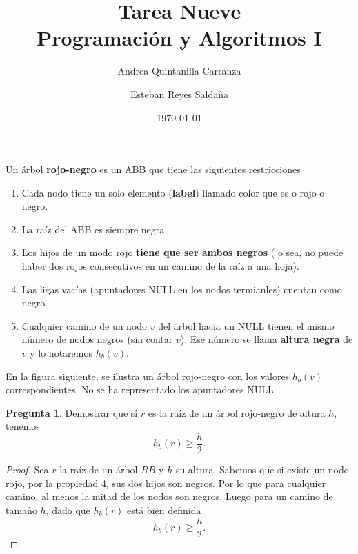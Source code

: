 \documentclass[12pt,letterpaper]{article}
\title{ \textbf{Tarea Nueve} \\ Programación y Algoritmos I}
\author{Andrea Quintanilla Carranza \and Esteban Reyes Saldaña}
\date{\today}
\theoremstyle{definition}
\newtheorem{problm}{Pregunta}
\begin{document}
	
\maketitle 
Un árbol \textbf{rojo-negro} es un ABB que tiene las siguientes restricciones
\begin{enumerate}
	\item Cada nodo tiene un solo elemento (\textbf{label}) llamado color que es o rojo o negro.
	\item La raíz del ABB es siempre negra.
	\item Los hijos de un modo rojo \textbf{tiene que ser ambos negros} ( o sea, no puede haber dos rojos consecutivos en un camino de la raíz a una hoja).
	\item Las ligas vacías (apuntadores NULL en los nodos termianles) cuentan como negro.
	\item Cualquier camino de un nodo $ v $ del árbol hacia un NULL tienen el mismo número de nodos negros (sin contar $ v $). Ese número se llama \textbf{altura negra} de $ v $ y lo notaremos $ h_b (v) $.
\end{enumerate}
En la figura siguiente, se ilustra un árbol rojo-negro con los valores $ h_b(v) $ correspondientes. No se ha representado los apuntadores NULL.
\begin{center}
\end{center}


\begin{problm} Demostrar que si $ r $ es la raíz de un árbol rojo-negro de altura $ h $, tenemos
\begin{equation}\label{eq1}
	h_b(r) \geq \frac{h}{2}.
\end{equation}
	\begin{proof}
		Sea $ r $ la raíz de un árbol $ RB $ y $ h $ su altura. Sabemos que si existe un nodo rojo, por la propiedad 4, sus dos hijos son negros. Por lo que para cualquier camino, al menos la mitad de los nodos son negros. Luego para un camino de tamaño $ h $, dado que $ h_b(r) $ está bien definida
		\[ h_b(r) \geq \frac{h}{2}. \]
	\end{proof}
\end{problm}
\end{document}
